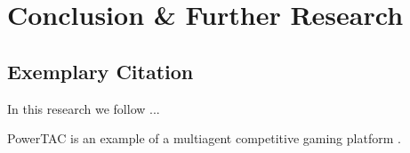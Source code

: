 \clearpage
\section{Conclusion \& Further Research}
\label{sec:Conclusion}

\subsection{Exemplary Citation}
\label{subsec:Section_Name_X/cite}


In this research we follow ...


PowerTAC is an example of a multiagent competitive gaming platform .